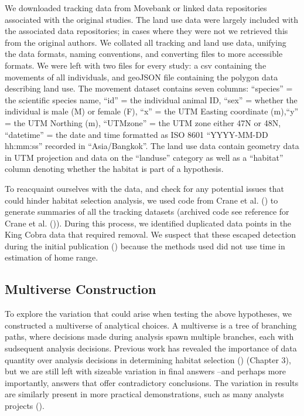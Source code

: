 \documentclass[10pt,a4paper]{article}
\begin{document}
We downloaded tracking data from Movebank or linked data repositories associated with the original studies.
The land use data were largely included with the associated data repositories; in cases where they were not we retrieved this from the original authors.
We collated all tracking and land use data, unifying the data formats, naming conventions, and converting files to more accessible formats.
We were left with two files for every study: a csv containing the movements of all individuals, and geoJSON file containing the polygon data describing land use.
The movement dataset contains seven columns: ``species'' = the scientific species name, ``id'' = the individual animal ID, ``sex'' = whether the individual is male (M) or female (F), ``x'' = the UTM Easting coordinate (m),``y'' = the UTM Northing (m), ``UTMzone'' = the UTM zone either 47N or 48N, ``datetime'' = the date and time formatted as ISO 8601 ``YYYY-MM-DD hh:mm:ss'' recorded in ``Asia/Bangkok''.
The land use data contain geometry data in UTM projection and data on the ``landuse'' category as well as a ``habitat'' column denoting whether the habitat is part of a hypothesis.

To reacquaint ourselves with the data, and check for any potential issues that could hinder habitat selection analysis, we used code from Crane et al. () to generate summaries of all the tracking datasets (archived code see reference for Crane et al. ()).
During this process, we identified duplicated data points in the King Cobra data that required removal.
We suspect that these escaped detection during the initial publication () because the methods used did not use time in estimation of home range.

\subsection{Multiverse Construction}\label{multiverse-construction}

To explore the variation that could arise when testing the above hypotheses, we constructed a multiverse of analytical choices.
A multiverse is a tree of branching paths, where decisions made during analysis spawn multiple branches, each with sudsequent analysis decisions.
Previous work has revealed the importance of data quantity over analysis decisions in determining habitat selection () (Chapter 3), but we are still left with sizeable variation in final answers --and perhaps more importantly, answers that offer contradictory conclusions.
The variation in results are similarly present in more practical demonstrations, such as many analysts projects ().
\end{document}
